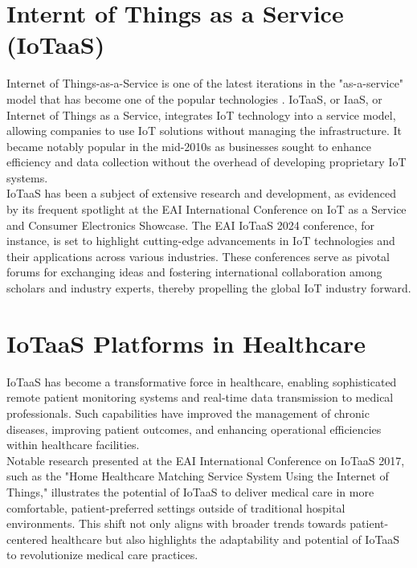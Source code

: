 \section{Internt of Things as a Service (IoTaaS)}
Internet of Things-as-a-Service is one of the latest iterations in the "as-a-service" model that has become one of the popular technologies \cite{45}. IoTaaS, or IaaS, or Internet of Things as a Service, integrates IoT technology into a service model, allowing companies to use IoT solutions without managing the infrastructure. It became notably popular in the mid-2010s as businesses sought to enhance efficiency and data collection without the overhead of developing proprietary IoT systems. \\

\noindent IoTaaS has been a subject of extensive research and development, as evidenced by its frequent spotlight at the EAI International Conference on IoT as a Service and Consumer Electronics Showcase. The EAI IoTaaS 2024 conference, for instance, is set to highlight cutting-edge advancements in IoT technologies and their applications across various industries. These conferences serve as pivotal forums for exchanging ideas and fostering international collaboration among scholars and industry experts, thereby propelling the global IoT industry forward.\cite{46} 

\section{IoTaaS Platforms in Healthcare}
IoTaaS has become a transformative force in healthcare, enabling sophisticated remote patient monitoring systems and real-time data transmission to medical professionals. Such capabilities have improved the management of chronic diseases, improving patient outcomes, and enhancing operational efficiencies within healthcare facilities. \\

\noindent Notable research presented at the EAI International Conference on IoTaaS 2017, such as the "Home Healthcare Matching Service System Using the Internet of Things," illustrates the potential of IoTaaS to deliver medical care in more comfortable, patient-preferred settings outside of traditional hospital environments.\cite{44} This shift not only aligns with broader trends towards patient-centered healthcare but also highlights the adaptability and potential of IoTaaS to revolutionize medical care practices. \\

